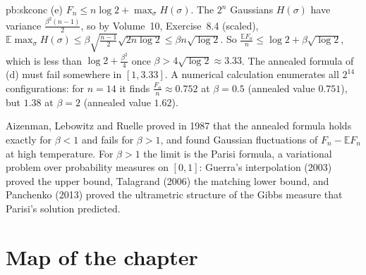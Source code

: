 \begin{solution}{pb:skconc}
(e) $F_n\le n\log2+\max_\sigma H(\sigma)$. The $2^n$ Gaussians $H(\sigma)$ have variance $\frac{\beta^2(n-1)}2$, so by Volume~10, Exercise~8.4 (scaled),
$\mathbb E\max_\sigma H(\sigma)\le\beta\sqrt{\frac{n-1}2}\sqrt{2n\log2}\le\beta n\sqrt{\log2}$. So $\frac{\mathbb EF_n}n\le\log2+\beta\sqrt{\log2}$, which is less than $\log2+\frac{\beta^2}4$ once
$\beta>4\sqrt{\log2}\approx3.33$. The annealed formula of (d) must fail somewhere in $[1,3.33]$. A numerical calculation enumerates all $2^{14}$ configurations: for $n=14$ it finds
$\frac{F_n}n\approx0.752$ at $\beta=0.5$ (annealed value $0.751$), but $1.38$ at $\beta=2$ (annealed value $1.62$).

\leads Aizenman, Lebowitz and Ruelle proved in 1987 that the annealed formula holds exactly for $\beta<1$ and fails for $\beta>1$, and found Gaussian fluctuations of $F_n-\mathbb EF_n$ at
high temperature. For $\beta>1$ the limit is the Parisi formula, a variational problem over probability measures on $[0,1]$: Guerra's interpolation (2003) proved the upper bound,
Talagrand (2006) the matching lower bound, and Panchenko (2013) proved the ultrametric structure of the Gibbs measure that Parisi's solution predicted.
\end{solution}

\section*{Map of the chapter}

